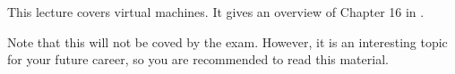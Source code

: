 This lecture covers virtual machines.
It gives an overview of Chapter 16 in \cite{Silberschatz2013osc}.

Note that this will not be coved by the exam.
However, it is an interesting topic for your future career, so you are 
recommended to read this material.
